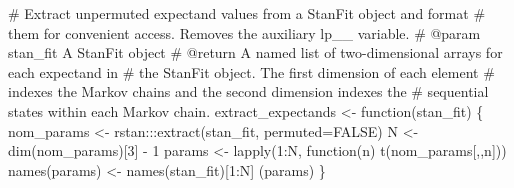 \documentclass[
  letterpaper,
  DIV=11,
  numbers=noendperiod]{scrartcl}
\newenvironment{Shaded}{\begin{snugshade}}{\end{snugshade}}
\newcommand{\CommentTok}[1]{\textcolor[rgb]{0.37,0.37,0.37}{#1}}
\newcommand{\DecValTok}[1]{\textcolor[rgb]{0.68,0.00,0.00}{#1}}
\newcommand{\NormalTok}[1]{\textcolor[rgb]{0.00,0.23,0.31}{#1}}
\newcommand{\OperatorTok}[1]{\textcolor[rgb]{0.37,0.37,0.37}{#1}}
\begin{document}
\begin{Shaded}
\begin{Highlighting}[]
\CommentTok{\# Extract unpermuted expectand values from a StanFit object and format }
\CommentTok{\# them for convenient access.  Removes the auxiliary \textasciigrave{}lp\_\_\textasciigrave{} variable.}
\CommentTok{\# @param stan\_fit A StanFit object}
\CommentTok{\# @return A named list of two{-}dimensional arrays for each expectand in }
\CommentTok{\#         the StanFit object.  The first dimension of each element }
\CommentTok{\#         indexes the Markov chains and the second dimension indexes the }
\CommentTok{\#         sequential states within each Markov chain. }
\NormalTok{extract\_expectands }\OperatorTok{\textless{}{-}}\NormalTok{ function(stan\_fit) \{}
\NormalTok{  nom\_params }\OperatorTok{\textless{}{-}}\NormalTok{ rstan:::extract(stan\_fit, permuted}\OperatorTok{=}\NormalTok{FALSE)}
\NormalTok{  N }\OperatorTok{\textless{}{-}}\NormalTok{ dim(nom\_params)[}\DecValTok{3}\NormalTok{] }\OperatorTok{{-}} \DecValTok{1}
\NormalTok{  params }\OperatorTok{\textless{}{-}}\NormalTok{ lapply(}\DecValTok{1}\NormalTok{:N, function(n) t(nom\_params[,,n]))}
\NormalTok{  names(params) }\OperatorTok{\textless{}{-}}\NormalTok{ names(stan\_fit)[}\DecValTok{1}\NormalTok{:N]}
\NormalTok{  (params)}
\NormalTok{\}}
\end{Highlighting}
\end{Shaded}
\end{document}
